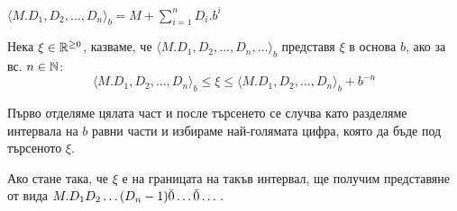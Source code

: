 \begin{notation}
    $\langle M. D_1, D_2, \dots, D_n\rangle_b = M + \sum\limits_{i=1}^{n}D_i.b^i$
\end{notation}
\begin{definition}
    Нека $\xi \in {\mathbb{R}}^{\geq 0}$, казваме, че $\langle M. D_1, D_2, \dots, D_n, \dots\rangle_b$ представя $\xi$ в основа $b$, ако за вс. $n \in {\mathbb{N}}$:
    \begin{equation*}
        \langle M. D_1, D_2, \dots, D_n\rangle_b \leq \xi \leq \langle M. D_1, D_2, \dots, D_n\rangle_b + b^{-n}
    \end{equation*}
\end{definition}
Първо отделяме цялата част и после търсенето се случва като разделяме интервала на $b$ равни части и избираме най-голямата цифра, която да бъде под търсеното $\xi$.

Ако стане така, че $\xi$ е на границата на такъв интервал, ще получим представяне от вида $M.D_1 D_2 \dots (D_n - 1) \Bar{0} \dots \Bar{0} \dots$.

